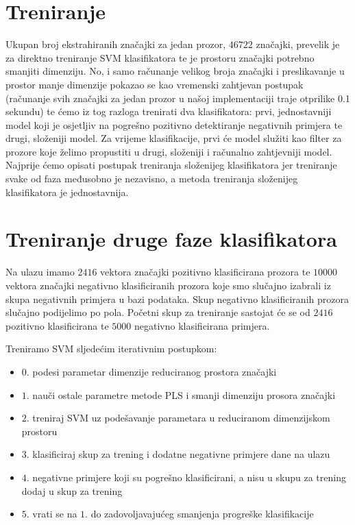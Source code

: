 \documentclass[seminar]{fer}
\begin{document}
\section{Treniranje}
Ukupan broj ekstrahiranih značajki za jedan prozor, $46722$ značajki, prevelik je za direktno treniranje SVM klasifikatora te je prostoru značajki potrebno smanjiti dimenziju. No, i samo računanje velikog broja značajki i preslikavanje u prostor manje dimenzije pokazao se kao vremenski zahtjevan postupak (računanje svih značajki za jedan prozor u našoj implementaciji traje otprilike 0.1 sekundu) te ćemo iz tog razloga trenirati dva klasifikatora: prvi, jednostavniji model koji je osjetljiv na pogrešno pozitivno detektiranje negativnih primjera te drugi, složeniji model.
Za vrijeme klasifikacije, prvi će model služiti kao filter za prozore koje želimo propustiti u drugi, složeniji i računalno zahtjevniji model. Najprije ćemo opisati postupak treniranja složenijeg klasifikatora jer treniranje svake od faza međusobno je nezavisno, a metoda treniranja složenijeg klasifikatora je jednostavnija.


\section{Treniranje druge faze klasifikatora}
Na ulazu imamo $2416$ vektora značajki pozitivno klasificirana prozora te $10000$ vektora značajki negativno klasificiranih prozora koje smo slučajno izabrali iz skupa negativnih primjera u bazi podataka. Skup negativno klasificiranih prozora slučajno podijelimo po pola. Početni skup za treniranje sastojat će se od $2416$ pozitivno klasificirana te $5000$ negativno klasificirana primjera.

Treniramo SVM sljedećim iterativnim postupkom:
\begin{itemize}
\item $0.$ podesi parametar dimenzije reduciranog prostora značajki
\item $1.$ nauči ostale parametre metode PLS i smanji dimenziju prosora značajki
\item $2.$ treniraj SVM uz podešavanje parametara u reduciranom dimenzijskom prostoru
\item $3.$ klasificiraj skup za trening i dodatne negativne primjere dane na ulazu
\item $4.$ negativne primjere koji su pogrešno klasificirani, a nisu u skupu za trening dodaj u skup za trening
\item $5.$ vrati se na $1.$ do zadovoljavajućeg smanjenja progreške klasifikacije
\end{itemize}
\end{document}
